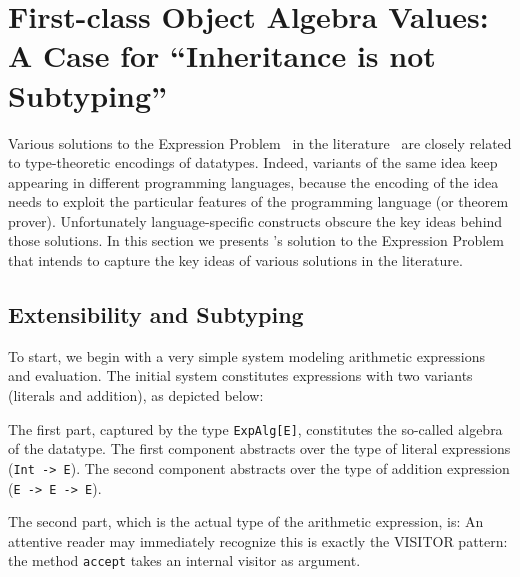 
\section{First-class Object Algebra Values: A Case for ``Inheritance is not
  Subtyping''}

Various solutions to the Expression Problem~\cite{wadler1998expression} in the
literature~\cite{finally-tagless,oliveira09modular,DelawareOS13,oliveira2012extensibility,
  swierstra:la-carte} are closely related to type-theoretic encodings of
datatypes. Indeed, variants of the same idea keep appearing in different
programming languages, because the encoding of the idea needs to exploit the
particular features of the programming language (or theorem prover).
Unfortunately language-specific constructs obscure the key ideas behind those
solutions. In this section we presents \name's solution to the Expression
Problem that intends to capture the key ideas of various solutions in the
literature.

\subsection{Extensibility and Subtyping}
\label{sec:extensibility}

To start, we begin with a very simple system modeling arithmetic expressions and
evaluation. The initial system constitutes expressions with two variants
(literals and addition), as depicted below:

The first part, captured by the type \lstinline{ExpAlg[E]}, constitutes the
so-called algebra of the datatype. The first component abstracts over the type
of literal expressions (\lstinline{Int -> E}). The second component abstracts
over the type of addition expression (\lstinline{E -> E -> E}).

The second part, which is the actual type of the arithmetic expression, is:
An attentive reader may immediately recognize this is exactly the VISITOR
pattern: the method \lstinline{accept} takes an internal visitor as argument.



